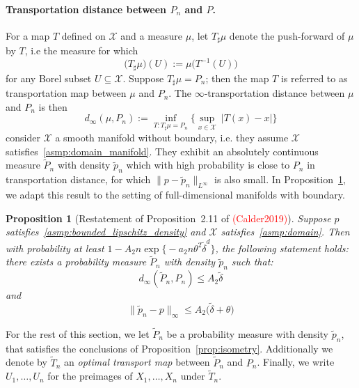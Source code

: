 \documentclass[twoside]{article}
\newcommand{\1}{\mathbf{1}}
\newcommand{\Xset}{\mathcal{X}}
\newcommand{\Leb}{L}
\newcommand{\wt}[1]{\widetilde{#1}}
\newtheorem{proposition}{Proposition}
\theoremstyle{definition}
\theoremstyle{remark}
\begin{document}
\paragraph{Transportation distance between $P_n$ and $P$.}
For a map $T$ defined on $\Xset$ and a measure $\mu$, let $T_{\sharp}\mu$ denote the push-forward of $\mu$ by $T$, i.e the measure for which
\begin{equation*}
\bigl(T_{\sharp}\mu\bigr)(U) := \mu\bigl(T^{-1}(U)\bigr)
\end{equation*}
for any Borel subset $U \subseteq \Xset$. Suppose $T_{\sharp}\mu = P_n$; then the map $T$ is referred to as transportation map between $\mu$ and $P_n$. The  $\infty$-transportation distance between $\mu$ and $P_n$ is then
\begin{equation*}
d_{\infty}(\mu,P_n) := \inf_{T: T_{\sharp} \mu = P_n} \biggl\{\sup_{x \in \Xset}~\bigl|T(x) - x\bigr|\biggr\}
\end{equation*}
\cite{calder2019} consider $\Xset$ a smooth manifold without boundary, i.e. they assume $\Xset$ satisfies~\ref{asmp:domain_manifold}. They exhibit an absolutely continuous measure $\wt{P}_n$ with density $\wt{p}_n$ which with high probability is close to $P_n$ in transportation distance, for which $\|p - \wt{p}_n\|_{\Leb^\infty}$ is also small. In Proposition~\ref{prop:optimal_transport}, we adapt this result to  the setting of full-dimensional manifolds with boundary.  
\begin{proposition}[Restatement of Proposition~2.11 of \textcolor{red}{(Calder2019)}]
	\label{prop:optimal_transport}
	Suppose $p$ satisfies~\ref{asmp:bounded_lipschitz_density} and $\Xset$ satisfies~\ref{asmp:domain}. Then with probability at least $1 - A_2 n \exp\bigl\{-a_2 n\theta^2\wt{\delta}^d\bigr\}$, the following statement holds: there exists a probability measure $\wt{P}_n$ with density $\wt{p}_n$ such that:
	\begin{equation*}
	d_{\infty}(\wt{P}_n, P_n) \leq A_2 \wt{\delta}
	\end{equation*}
	and
	\begin{equation*}
	\|\wt{p}_n - p\|_{\infty} \leq A_2\bigl(\wt{\delta} + \theta\bigr)
	\end{equation*}
\end{proposition}
For the rest of this section, we let $\wt{P}_n$ be a probability measure with density $\wt{p}_n$, that satisfies the conclusions of Proposition~\ref{prop:isometry}. Additionally we denote by $\wt{T}_n$ an \emph{optimal transport map} between $\wt{P}_n$ and $P_n$. Finally, we write $U_1,\ldots,U_n$ for the preimages of $X_1,\ldots,X_n$ under $\wt{T}_n$. 
\end{document}
